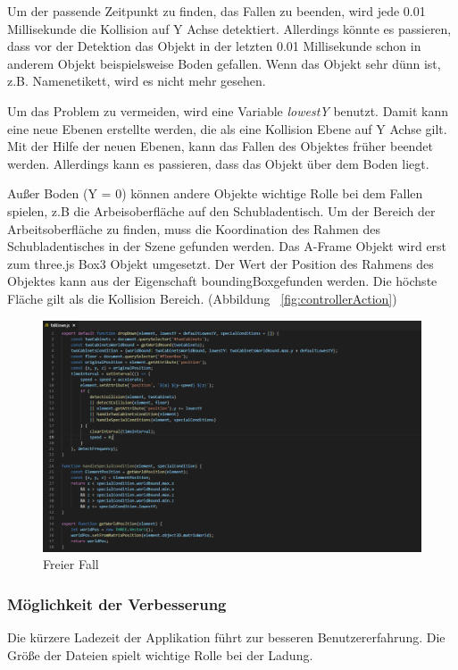   Um der passende Zeitpunkt zu finden, das Fallen zu beenden, wird jede 0.01 Millisekunde die Kollision auf Y Achse detektiert. Allerdings könnte es passieren, dass vor der Detektion das Objekt in der letzten 0.01 Millisekunde schon in anderem Objekt beispielsweise Boden gefallen. Wenn das Objekt sehr dünn ist, z.B. Namenetikett, wird es nicht mehr gesehen.
  
  Um das Problem zu vermeiden, wird eine Variable \textit{lowestY} benutzt. Damit kann eine neue Ebenen erstellte werden, die als eine Kollision Ebene auf Y Achse gilt. Mit der Hilfe der neuen Ebenen, kann das Fallen des Objektes früher beendet werden. Allerdings kann es passieren, dass das Objekt über dem Boden liegt.
  
  Außer Boden (Y = 0) können andere Objekte wichtige Rolle bei dem Fallen spielen, z.B die Arbeisoberfläche auf den Schubladentisch. Um der Bereich der Arbeitsoberfläche zu finden, muss die Koordination des Rahmen des Schubladentisches in der Szene gefunden werden. Das A-Frame Objekt wird erst zum three.js Box3 Objekt umgesetzt. Der Wert der Position des Rahmens des Objektes kann aus der Eigenschaft \glqq boundingBox\grqq gefunden werden. Die höchste Fläche gilt als die Kollision Bereich. (Abbildung ~\ref{fig:controllerAction})
  
\begin{figure}[ht]
\vspace*{1cm}
\centering
\includegraphics[width=\textwidth]{images/fallDown.png}
\caption[Freier Fall]{Freier Fall}
\label{fig:fallDown} 
\end{figure}
  
  \subsubsection{Möglichkeit der Verbesserung}
  Die kürzere Ladezeit der Applikation führt zur besseren Benutzererfahrung. Die Größe der Dateien spielt wichtige Rolle bei der Ladung.
  
